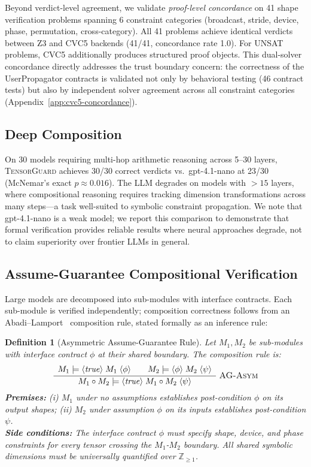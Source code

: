 \documentclass[11pt]{article}
\newtheorem{definition}[theorem]{Definition}
\begin{document}
Beyond verdict-level agreement, we validate \emph{proof-level concordance}
on 41 shape verification problems spanning 6 constraint categories
(broadcast, stride, device, phase, permutation, cross-category).
All 41 problems achieve identical verdicts between Z3 and CVC5 backends
(41/41, concordance rate 1.0).  For UNSAT problems, CVC5 additionally
produces structured proof objects.  This
dual-solver concordance directly
addresses the trust boundary concern: the correctness of the
UserPropagator contracts is validated not only by behavioral testing
(46 contract tests) but also by independent solver agreement across
all constraint categories (Appendix~\ref{app:cvc5-concordance}).

\subsection{Deep Composition}

On 30 models requiring multi-hop arithmetic reasoning across
5--30 layers, \textsc{TensorGuard} achieves 30/30 correct verdicts
vs.\ gpt-4.1-nano at 23/30 (McNemar's exact $p \approx 0.016$).
The LLM degrades on models with $>15$ layers, where compositional
reasoning requires tracking dimension transformations across many
steps---a task well-suited to symbolic constraint propagation.
We note that gpt-4.1-nano is a weak model; we report this comparison
to demonstrate that formal verification provides reliable results
where neural approaches degrade, not to claim superiority over
frontier LLMs in general.

\subsection{Assume-Guarantee Compositional Verification}

Large models are decomposed into sub-modules with interface contracts.
Each sub-module is verified independently; composition correctness
follows from an Abadi--Lamport~\cite{abadi95} composition rule,
stated formally as an inference rule:

\begin{definition}[Asymmetric Assume-Guarantee Rule]\label{def:ag-rule}
Let $M_1, M_2$ be sub-modules with interface contract $\phi$ at
their shared boundary.  The composition rule is:
\[
\frac{
  \begin{array}{c}
  M_1 \models \langle \mathit{true} \rangle\; M_1 \;\langle \phi \rangle
  \qquad
  M_2 \models \langle \phi \rangle\; M_2 \;\langle \psi \rangle
  \end{array}
}{
  M_1 \circ M_2 \models \langle \mathit{true} \rangle\; M_1 \circ M_2 \;\langle \psi \rangle
}
\;\textsc{AG-Asym}
\]
\textbf{Premises:} (i) $M_1$ under no assumptions establishes
post-condition $\phi$ on its output shapes; (ii) $M_2$ under
assumption $\phi$ on its inputs establishes post-condition $\psi$.\\
\textbf{Side conditions:} The interface contract $\phi$ must specify
shape, device, and phase constraints for every tensor crossing the
$M_1$-$M_2$ boundary.  All shared symbolic dimensions must be
universally quantified over $\mathbb{Z}_{\geq 1}$.
\end{definition}
\end{document}
